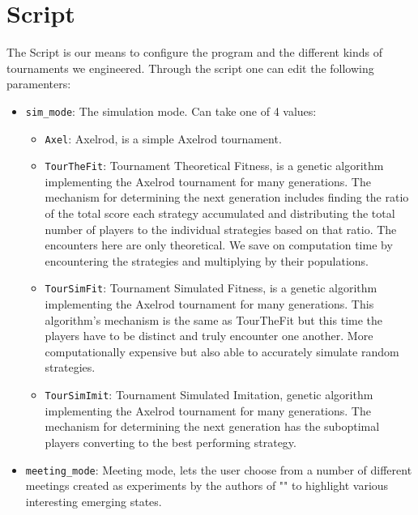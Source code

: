 \documentclass[12pt]{article}
\begin{document}

\section{Script}
The Script is our means to configure the program and the different kinds of tournaments we engineered. Through the script one can edit the following paramenters:
\begin{itemize}
    \item \texttt{sim\_mode}: The simulation mode. Can take one of 4 values:
        \begin{itemize}
            \item \texttt{Axel}: Axelrod, is a simple Axelrod tournament.
            \item \texttt{TourTheFit}: Tournament Theoretical Fitness, is a genetic algorithm implementing the Axelrod tournament for many generations. The mechanism for determining the next generation includes finding the ratio of the total score each strategy accumulated and distributing the total number of players to the individual strategies based on that ratio. The encounters here are only theoretical. We save on computation time by encountering the strategies and multiplying by their populations. 
            \item \texttt{TourSimFit}: Tournament Simulated Fitness, is a genetic algorithm implementing the Axelrod tournament for many generations. This algorithm's mechanism is the same as TourTheFit but this time the players have to be distinct and truly encounter one another. More computationally expensive but also able to accurately simulate random strategies.
            \item \texttt{TourSimImit}: Tournament Simulated Imitation, genetic algorithm implementing the Axelrod tournament for many generations. The mechanism for determining the next generation has the suboptimal players converting to the best performing strategy.
        \end{itemize}
    \item \texttt{meeting\_mode}: Meeting mode, lets the user choose from a number of different meetings created as experiments by the authors of "" to highlight various interesting emerging states.
\end{itemize}
\end{document}
